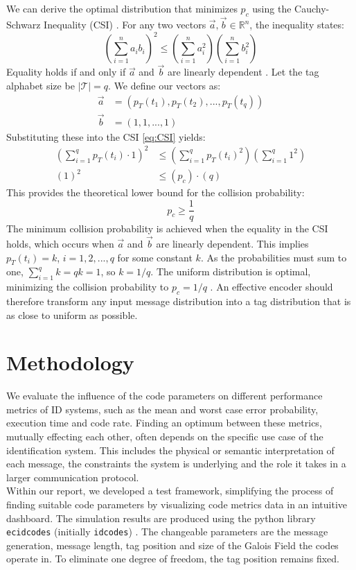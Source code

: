 \documentclass[english,BCOR=4mm,cdfont=false]{tudscrreprt} %
\begin{document}
We can derive the optimal distribution that minimizes $p_c$ using the Cauchy-Schwarz Inequality (CSI) \cite{steele2004cauchy}. For any two vectors $\vec{a}, \vec{b} \in \mathbb{R}^n$, the inequality states:
\begin{equation}
\left(\sum_{i=1}^n a_i b_i\right)^2 \leq \left(\sum_{i=1}^n a_i^2\right) \left(\sum_{i=1}^n b_i^2\right) \label{eq:CSI}
\end{equation}
Equality holds if and only if $\vec{a}$ and $\vec{b}$ are linearly dependent \cite{steele2004cauchy}. Let the tag alphabet size be $|\mathcal{T}| = q$. We define our vectors as:
\begin{align*}
    \vec{a} &= (p_T(t_1), p_T(t_2), ..., p_T(t_q)) \\
    \vec{b} &= (1, 1, ..., 1)
\end{align*}
Substituting these into the CSI \eqref{eq:CSI} yields:
\begin{align*}
    \left(\sum_{i=1}^q p_T(t_i) \cdot 1\right)^2 &\leq \left(\sum_{i=1}^q p_T(t_i)^2\right) \left(\sum_{i=1}^q 1^2\right) \\
    \left(1\right)^2 &\leq (p_c) \cdot (q)
\end{align*}
This provides the theoretical lower bound for the collision probability:
\begin{equation}
    p_c \geq \frac{1}{q}
\end{equation}
The minimum collision probability is achieved when the equality in the CSI holds, which occurs when $\vec{a}$ and $\vec{b}$ are linearly dependent. This implies $p_T(t_i) = k$, $i = 1,2,...,q$ for some constant $k$. As the probabilities must sum to one, $\sum_{i=1}^q k = qk = 1$, so $k = 1/q$. The uniform distribution is optimal, minimizing the collision probability to $p_c = 1/q$ \cite{cover2006elements}. An effective encoder should therefore transform any input message distribution into a tag distribution that is as close to uniform as possible.


\chapter{Methodology}

We evaluate the influence of the code parameters on different performance metrics of ID systems, such as the mean and worst case error probability, execution time and code rate. 
Finding an optimum between these metrics, mutually effecting each other, often depends on the specific use case of the identification system. This includes the physical or semantic interpretation of each message, the constraints the system is underlying and the role it takes in a larger communication protocol. \\
Within our report, we developed a test framework, simplifying the process of finding suitable code parameters by visualizing code metrics data in an intuitive dashboard. 
The simulation results are produced using the python library \texttt{ecidcodes} (initially \texttt{idcodes}) \cite{ecidcodesLib}. The changeable parameters are the message generation, message length, tag position and size of the Galois Field the codes operate in. To eliminate one degree of freedom, the tag position remains fixed. 
\end{document}
